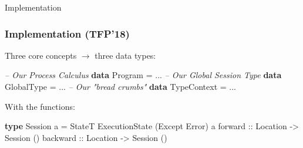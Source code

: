 \documentclass[12pt]{beamer}
\newenvironment{Shaded}{}{}
\newcommand{\KeywordTok}[1]{\textcolor[rgb]{0.00,0.44,0.13}{\textbf{#1}}}
\newcommand{\DataTypeTok}[1]{\textcolor[rgb]{0.56,0.13,0.00}{#1}}
\newcommand{\CommentTok}[1]{\textcolor[rgb]{0.38,0.63,0.69}{\textit{#1}}}
\newcommand{\OtherTok}[1]{\textcolor[rgb]{0.00,0.44,0.13}{#1}}
\newcommand{\FunctionTok}[1]{\textcolor[rgb]{0.02,0.16,0.49}{#1}}
\newcommand{\NormalTok}[1]{#1}
\begin{document}
\begin{frame}
\begin{center}
    \LARGE{Implementation} 
\end{center}
\end{frame}



\begin{frame}[fragile]
\frametitle{Implementation  (TFP'18)}
    Three core concepts $\rightarrow$ three data types:
    \begin{Shaded}
        \begin{Highlighting}[]
            \CommentTok{-- Our Process Calculus}
            \KeywordTok{data} \DataTypeTok{Program} \FunctionTok{=} \NormalTok{...} 
            \CommentTok{-- Our Global Session Type} 
            \KeywordTok{data} \DataTypeTok{GlobalType} \FunctionTok{=} \NormalTok{...} 
            \CommentTok{-- Our "bread crumbs"} 
            \KeywordTok{data} \DataTypeTok{TypeContext} \FunctionTok{=} \NormalTok{...} 
        \end{Highlighting}
    \end{Shaded}
    With the functions:
    \begin{Shaded}
        \begin{Highlighting}[]
            \KeywordTok{type} \DataTypeTok{Session} \NormalTok{a }\FunctionTok{=} \DataTypeTok{StateT} \DataTypeTok{ExecutionState} \NormalTok{(}\DataTypeTok{Except} \DataTypeTok{Error}\NormalTok{) a}
            \OtherTok{forward  ::} \DataTypeTok{Location} \OtherTok{->} \DataTypeTok{Session} \NormalTok{()}
            \OtherTok{backward ::} \DataTypeTok{Location} \OtherTok{->} \DataTypeTok{Session} \NormalTok{()}
        \end{Highlighting}
    \end{Shaded}

\end{frame}
\end{document}

